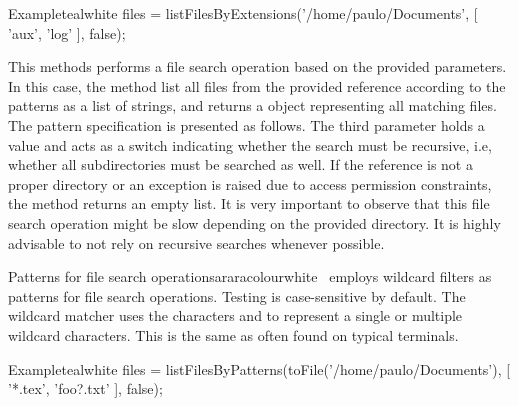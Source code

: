 \begin{description}
\begin{codebox}{Example}{teal}{\icnote}{white}
files = listFilesByExtensions('/home/paulo/Documents',
        [ 'aux', 'log' ], false);
\end{codebox}

\item[\mdbox{R}{\parbox{0.59\textwidth}{listFilesByPatterns(File file,\\\hspace*{1em} List<String> patterns, boolean recursive)}}{List<File>}] This methods performs a file search operation based on the provided parameters. In this case, the method list all files from the provided  reference according to the  patterns as a list of strings, and returns a  object representing all matching files. The pattern specification is presented as follows. The third parameter holds a  value and acts as a switch indicating whether the search must be recursive, i.e, whether all subdirectories must be searched as well. If the reference is not a proper directory or an exception is raised due to access permission constraints, the  method returns an empty list. It is very important to observe that this file search operation might be slow depending on the provided directory. It is highly advisable to not rely on recursive searches whenever possible.

\begin{messagebox}{Patterns for file search operations}{araracolour}{\icattention}{white}
\arara\ employs wildcard filters as patterns for file search operations. Testing is case-sensitive by default. The wildcard matcher uses the characters  and \rbox[araracolour]{*} to represent a single or multiple wildcard characters. This is the same as often found on typical terminals.
\end{messagebox}

\begin{codebox}{Example}{teal}{\icnote}{white}
files = listFilesByPatterns(toFile('/home/paulo/Documents'),
        [ '*.tex', 'foo?.txt' ], false);
\end{codebox}



\end{description}
